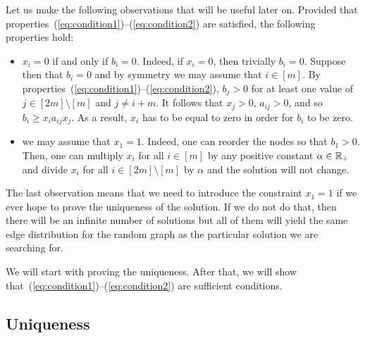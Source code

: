\medskip

Let us make the following observations that will be useful later on. Provided that properties~(\ref{eq:condition1})--(\ref{eq:condition2}) are satisfied, the following properties hold:
\begin{itemize}
    \item $x_i=0$ if and only if $b_i=0$. Indeed, if $x_i = 0$, then trivially $b_i =0$. Suppose then that $b_i=0$ and by symmetry we may assume that $i\in[m]$. By properties~(\ref{eq:condition1})--(\ref{eq:condition2}), $b_j > 0$ for at least one value of $j \in [2m]\setminus[m]$ and $j\neq i+m$. It follows that $x_j > 0$, $a_{ij} > 0$, and so $b_i \ge x_i a_{ij} x_j$. As a result, $x_i$ has to be equal to zero in order for $b_i$ to be zero. 
    \item we may assume that $x_1=1$. Indeed, one can reorder the nodes so that $b_1>0$. Then, one can multiply $x_i$ for all $i\in[m]$ by any positive constant $\alpha \in {\mathbb R}_+$ and divide $x_i$ for all $i \in [2m] \setminus [m]$ by $\alpha$ and the solution will not change.
\end{itemize}

The last observation means that we need to introduce the constraint $x_1=1$ if we ever hope to prove the uniqueness of the solution. If we do not do that, then there will be an infinite number of solutions but all of them will yield the same edge distribution for the random graph as the particular solution we are searching for.

\medskip

We will start with proving the uniqueness. After that, we will show that~(\ref{eq:condition1})--(\ref{eq:condition2}) are sufficient conditions.

\subsection{Uniqueness}

